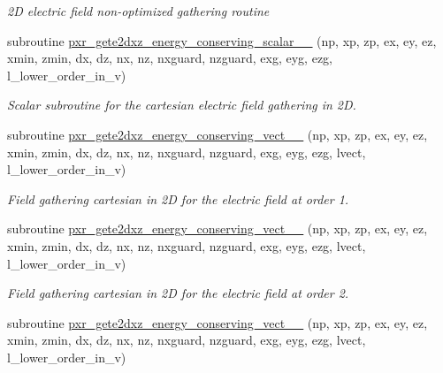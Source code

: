 \begin{DoxyCompactItemize}
\begin{DoxyCompactList}\small\item\em 2D electric field non-\/optimized gathering routine \end{DoxyCompactList}\item 
subroutine \hyperlink{field__gathering__2d_8_f90_a5ef609cbdc09685a5b9d25cbd474cefd}{pxr\+\_\+gete2dxz\+\_\+energy\+\_\+conserving\+\_\+scalar\+\_\+\_} (np, xp, zp, ex, ey, ez, xmin, zmin, dx, dz, nx, nz,                                                                               nxguard, nzguard, exg, eyg, ezg, l\+\_\+lower\+\_\+order\+\_\+in\+\_\+v)
\begin{DoxyCompactList}\small\item\em Scalar subroutine for the cartesian electric field gathering in 2D. \end{DoxyCompactList}\item 
subroutine \hyperlink{field__gathering__2d_8_f90_a648309863f3cb8275194e515781497a3}{pxr\+\_\+gete2dxz\+\_\+energy\+\_\+conserving\+\_\+vect\+\_\+\_} (np, xp, zp, ex, ey, ez, xmin, zmin, dx, dz, nx, nz,                                                                           nxguard, nzguard, exg, eyg, ezg, lvect, l\+\_\+lower\+\_\+order\+\_\+in\+\_\+v)
\begin{DoxyCompactList}\small\item\em Field gathering cartesian in 2D for the electric field at order 1. \end{DoxyCompactList}\item 
subroutine \hyperlink{field__gathering__2d_8_f90_a8e30aa1e650fe0c61382d066dde2e3f3}{pxr\+\_\+gete2dxz\+\_\+energy\+\_\+conserving\+\_\+vect\+\_\+\_} (np, xp, zp, ex, ey, ez, xmin, zmin, dx, dz, nx, nz,                                                                           nxguard, nzguard, exg, eyg, ezg, lvect, l\+\_\+lower\+\_\+order\+\_\+in\+\_\+v)
\begin{DoxyCompactList}\small\item\em Field gathering cartesian in 2D for the electric field at order 2. \end{DoxyCompactList}\item 
subroutine \hyperlink{field__gathering__2d_8_f90_a419fb25a20aa69b7d3e11655fe89eb44}{pxr\+\_\+gete2dxz\+\_\+energy\+\_\+conserving\+\_\+vect\+\_\+\_} (np, xp, zp, ex, ey, ez, xmin, zmin, dx, dz, nx, nz,                                                                           nxguard, nzguard, exg, eyg, ezg, lvect, l\+\_\+lower\+\_\+order\+\_\+in\+\_\+v)

\end{DoxyCompactItemize}
